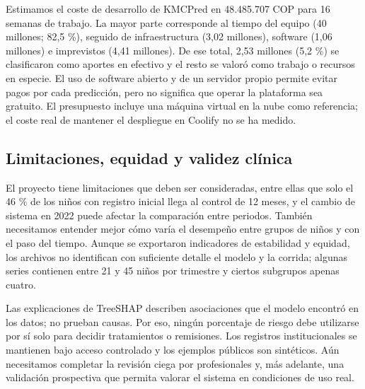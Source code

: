 Estimamos el coste de desarrollo de KMCPred en 48.485.707 COP para 16 semanas de trabajo. La mayor parte corresponde al tiempo del equipo (40 millones; 82,5 \%), seguido de infraestructura (3,02 millones), software (1,06 millones) e imprevistos (4,41 millones). De ese total, 2,53 millones (5,2 \%) se clasificaron como aportes en efectivo y el resto se valoró como trabajo o recursos en especie. El uso de software abierto y de un servidor propio permite evitar pagos por cada predicción, pero no significa que operar la plataforma sea gratuito. El presupuesto incluye una máquina virtual en la nube como referencia; el coste real de mantener el despliegue en Coolify no se ha medido.

\subsection{Limitaciones, equidad y validez clínica}
\label{sec:5.4}

El proyecto tiene limitaciones que deben ser consideradas, entre ellas que solo el 46 \% de los niños con registro inicial llega al control de 12 meses, y el cambio de sistema en 2022 puede afectar la comparación entre periodos. También necesitamos entender mejor cómo varía el desempeño entre grupos de niños y con el paso del tiempo. Aunque se exportaron indicadores de estabilidad y equidad, los archivos no identifican con suficiente detalle el modelo y la corrida; algunas series contienen entre 21 y 45 niños por trimestre y ciertos subgrupos apenas cuatro.

Las explicaciones de TreeSHAP describen asociaciones que el modelo encontró en los datos; no prueban causas. Por eso, ningún porcentaje de riesgo debe utilizarse por sí solo para decidir tratamientos o remisiones. Los registros institucionales se mantienen bajo acceso controlado y los ejemplos públicos son sintéticos. Aún necesitamos completar la revisión ciega por profesionales y, más adelante, una validación prospectiva que permita valorar el sistema en condiciones de uso real.

